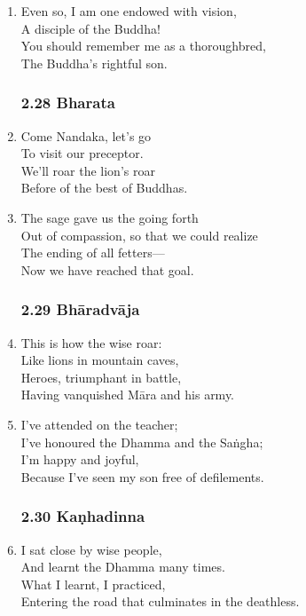 \documentclass[10pt, openany]{book}
\begin{document}
\begin{enumerate}
\item Even so, I am one endowed with vision,\\
A disciple of the Buddha!\\
You should remember me as a thoroughbred,\\
The Buddha’s rightful son.

\subsubsection*{2.28 Bharata}

\item Come Nandaka, let’s go\\
To visit our preceptor.\\
We’ll roar the lion’s roar\\
Before of the best of Buddhas.

\item The sage gave us the going forth\\
Out of compassion, so that we could realize\\
The ending of all fetters—\\
Now we have reached that goal.

\subsubsection*{2.29 Bhāradvāja}

\item This is how the wise roar:\\
Like lions in mountain caves,\\
Heroes, triumphant in battle,\\
Having vanquished Māra and his army.

\item I’ve attended on the teacher;\\
I’ve honoured the Dhamma and the Saṅgha;\\
I’m happy and joyful,\\
Because I’ve seen my son free of defilements.

\subsubsection*{2.30 Kaṇhadinna}

\item I sat close by wise people,\\
And learnt the Dhamma many times.\\
What I learnt, I practiced,\\
Entering the road that culminates in the deathless.


\end{enumerate}
\end{document}
